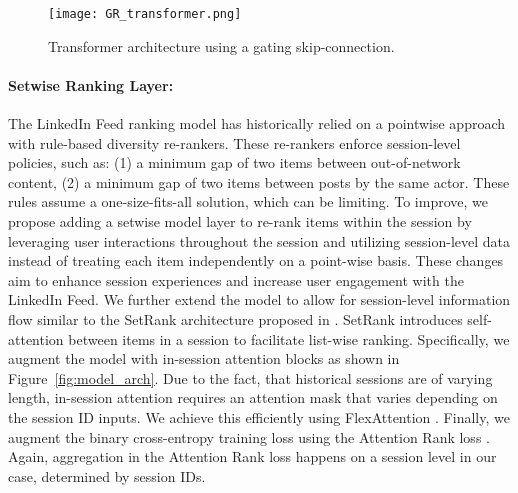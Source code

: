 \begin{figure}
    \centering
    \texttt{[image: GR\_transformer.png]}
    \caption{{\systemname} Transformer architecture using a gating skip-connection.}
    \label{fig:custom-transformer}
\end{figure}


\paragraph {Setwise Ranking Layer:}
The LinkedIn Feed ranking model has historically relied on a pointwise approach with rule-based diversity re-rankers. These re-rankers enforce session-level policies, such as:  (1) a minimum gap of two items between out-of-network content, (2)
a minimum gap of two items between posts by the same actor.
These rules assume a one-size-fits-all solution, which can be limiting. To improve, we propose adding a setwise model layer 
to re-rank items within the session by leveraging user interactions throughout the session and utilizing session-level data instead of treating each item independently on a point-wise basis. These changes aim to enhance session experiences and increase user engagement with the LinkedIn Feed. 
We further extend the {\systemname} model to allow for session-level information flow similar to the SetRank architecture proposed in \cite{SetRank_paper}. SetRank introduces self-attention between items in a session to facilitate list-wise ranking. Specifically, we augment the {\systemname} model with in-session attention blocks as shown in Figure~\ref{fig:model_arch}. Due to the fact, that historical sessions are of varying length, in-session attention requires an attention mask that varies depending on the session ID inputs. We achieve this efficiently using  FlexAttention \cite{flex_attention}.
Finally, we augment the binary cross-entropy training loss using the Attention Rank loss \cite{ai2018learning}. Again, aggregation in the Attention Rank loss happens on a session level in our case, determined by session IDs.